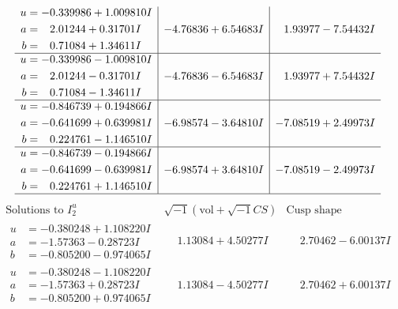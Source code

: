 \documentclass[1p]{elsarticle_modified}
\theoremstyle{definition}
\newcommand{\I}{\sqrt{-1}}
\begin{document}
$$\begin{array}{c|c|c}
\begin{aligned}
u &= -0.339986 + 1.009810 I \\
a &= \phantom{-}2.01244 + 0.31701 I \\
b &= \phantom{-}0.71084 + 1.34611 I\end{aligned}
 & -4.76836 + 6.54683 I & \phantom{-}1.93977 - 7.54432 I \\ \hline\begin{aligned}
u &= -0.339986 - 1.009810 I \\
a &= \phantom{-}2.01244 - 0.31701 I \\
b &= \phantom{-}0.71084 - 1.34611 I\end{aligned}
 & -4.76836 - 6.54683 I & \phantom{-}1.93977 + 7.54432 I \\ \hline\begin{aligned}
u &= -0.846739 + 0.194866 I \\
a &= -0.641699 + 0.639981 I \\
b &= \phantom{-}0.224761 - 1.146510 I\end{aligned}
 & -6.98574 - 3.64810 I & -7.08519 + 2.49973 I \\ \hline\begin{aligned}
u &= -0.846739 - 0.194866 I \\
a &= -0.641699 - 0.639981 I \\
b &= \phantom{-}0.224761 + 1.146510 I\end{aligned}
 & -6.98574 + 3.64810 I & -7.08519 - 2.49973 I\\
 \hline 
 \end{array}$$\newpage$$\begin{array}{c|c|c}  
\text{Solutions to }I^u_{2}& \I (\text{vol} + \sqrt{-1}CS) & \text{Cusp shape}\\
 \hline 
\begin{aligned}
u &= -0.380248 + 1.108220 I \\
a &= -1.57363 - 0.28723 I \\
b &= -0.805200 - 0.974065 I\end{aligned}
 & \phantom{-}1.13084 + 4.50277 I & \phantom{-}2.70462 - 6.00137 I \\ \hline\begin{aligned}
u &= -0.380248 - 1.108220 I \\
a &= -1.57363 + 0.28723 I \\
b &= -0.805200 + 0.974065 I\end{aligned}
 & \phantom{-}1.13084 - 4.50277 I & \phantom{-}2.70462 + 6.00137 I \\ \hline\begin{aligned}

\end{aligned}
\end{array}$$
\end{document}
